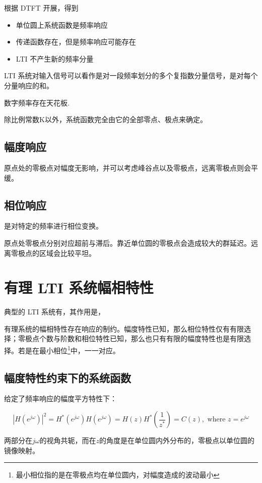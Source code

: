 \documentclass[cn,11pt,chinese,black,simple]{../elegantbook}
\begin{document}
根据 DTFT 开展，得到 

\begin{itemize}
    \item 单位圆上系统函数是频率响应
    \item 传递函数存在，但是频率响应可能存在
    \item LTI 不产生新的频率分量
\end{itemize}


LTI 系统对输入信号可以看作是对一段频率划分的多个复指数分量信号，是对每个分量响应的和。

数字频率存在天花板.

除比例常数K以外，系统函数完全由它的全部零点、极点来确定。

\subsection{幅度响应}

原点处的零极点对幅度无影响，并可以考虑峰谷点以及零极点，远离零极点则会平缓。

\subsection{相位响应}

是对特定的频率进行相位变换。

原点处零极点分别对应超前与滞后。靠近单位圆的零极点会造成较大的群延迟。远离零极点的区域会比较平坦。

\section{有理 LTI 系统幅相特性}

典型的 LTI 系统有，其作用是，

有理系统的幅相特性存在响应的制约。幅度特性已知，那么相位特性仅有有限选择；零极点个数与阶数和相位特性已知，那么也只有有限的幅度特性也是有限选择。若是在最小相位\footnote{最小相位指的是在零极点均在单位圆内，对幅度造成的波动最小}中，一一对应。

\subsection{幅度特性约束下的系统函数}

给定了频率响应的幅度平方特性下：

\[|H(e^{j\omega})|^2 = H^*(e^{j\omega}) H(e^{j\omega}) = H(z)H^*(\frac{1}{z^*}) = C(z), \text{ where } z = e^{j\omega}\] 


两部分在\(j\omega\)的视角共轭，而在\(z\)的角度是在单位圆内外分布的，零极点以单位圆的镜像映射。
\end{document}

